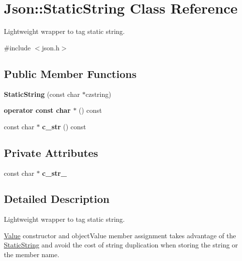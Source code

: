 \hypertarget{classJson_1_1StaticString}{}\section{Json\+:\+:Static\+String Class Reference}
\label{classJson_1_1StaticString}


Lightweight wrapper to tag static string.  




{\ttfamily \#include $<$json.\+h$>$}

\subsection*{Public Member Functions}
\begin{DoxyCompactItemize}
\item 
\mbox{\label{classJson_1_1StaticString_afb6baf1ec078ce76f0b0f9b39d19437f}} 
{\bfseries Static\+String} (const char $\ast$czstring)
\item 
\mbox{\label{classJson_1_1StaticString_a256a6cc0c630aef670848a0f11707b62}} 
{\bfseries operator const char $\ast$} () const
\item 
\mbox{\label{classJson_1_1StaticString_ad6be703d432d108623bb0aa06b0b90ca}} 
const char $\ast$ {\bfseries c\+\_\+str} () const
\end{DoxyCompactItemize}
\subsection*{Private Attributes}
\begin{DoxyCompactItemize}
\item 
\mbox{\label{classJson_1_1StaticString_a9f0d9e8caee8f8db14e2c8c24760dffd}} 
const char $\ast$ {\bfseries c\+\_\+str\+\_\+}
\end{DoxyCompactItemize}


\subsection{Detailed Description}
Lightweight wrapper to tag static string. 

\hyperlink{classJson_1_1Value}{Value} constructor and object\+Value member assignment takes advantage of the \hyperlink{classJson_1_1StaticString}{Static\+String} and avoid the cost of string duplication when storing the string or the member name.

